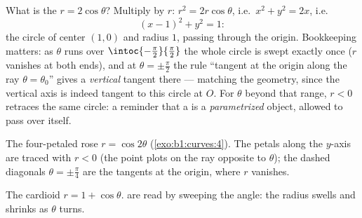 \begin{example}
\label{ex:b1:curves:polarcircle}
What is the  $r = 2\cos\theta$? Multiply by $r$:
$r^2 = 2r\cos\theta$, i.e.\ $x^2 + y^2 = 2x$, i.e.
\[
(x - 1)^2 + y^2 = 1 :
\]
the circle of center $(1, 0)$ and radius $1$, passing through
the origin. Bookkeeping matters: as $\theta$ runs over
$\intoc{-\frac\pi2}{\frac\pi2}$ the whole circle is swept
exactly once ($r$ vanishes at both ends), and at $\theta =
\pm\frac\pi2$ the rule ``tangent at the origin along the ray
$\theta = \theta_0$'' gives a \emph{vertical} tangent there ---
matching the geometry, since the vertical axis is indeed tangent
to this circle at $O$. For $\theta$ beyond that range, $r < 0$
retraces the same circle: a reminder that a  is a
\emph{parametrized} object, allowed to pass over itself.
\end{example}

\begin{omfigure}

{\small The four-petaled rose $r = \cos 2\theta$
(\cref{exo:b1:curves:4}). The petals along the $y$-axis are
traced with $r < 0$ (the point plots on the ray opposite to
$\theta$); the dashed diagonals $\theta = \pm\frac\pi4$ are the
tangents at the origin, where $r$ vanishes.}
\end{omfigure}

\begin{omfigure}

{\small The cardioid $r = 1 + \cos\theta$.  are read by
sweeping the angle: the radius swells and shrinks as $\theta$
turns.}
\end{omfigure}

